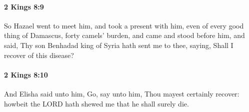 		\paragraph{2 Kings 8:9} %
			\label{2KINGS-8-9}

			So Hazael went to meet him, and took a present with him, even of every good thing of Damascus, forty camels’ burden, and came and stood before him, and said, Thy son Benhadad king of Syria hath sent me to thee, saying, Shall I recover of this disease?


		\paragraph{2 Kings 8:10} %
			\label{2KINGS-8-10}

			And Elisha said unto him, Go, say unto him, Thou mayest certainly recover: howbeit the LORD hath shewed me that he shall surely die.

